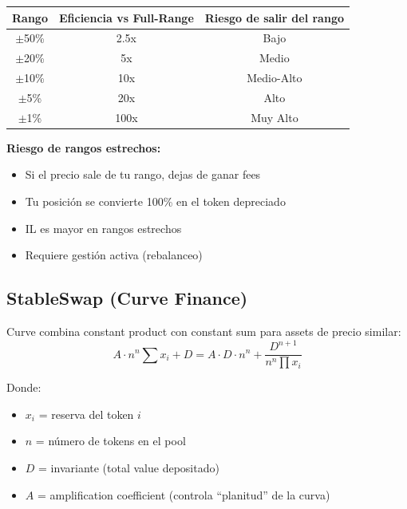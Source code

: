 \documentclass[11pt,a4paper,twoside]{book}
\begin{document}
\begin{center}
\begin{tabular}{ccc}
\toprule
Rango & Eficiencia vs Full-Range & Riesgo de salir del rango \\
\midrule
$\pm$50\% & 2.5x & Bajo \\
$\pm$20\% & 5x & Medio \\
$\pm$10\% & 10x & Medio-Alto \\
$\pm$5\% & 20x & Alto \\
$\pm$1\% & 100x & Muy Alto \\
\bottomrule
\end{tabular}
\end{center}

\begin{remark}
\textbf{Riesgo de rangos estrechos:}
\begin{itemize}
    \item Si el precio sale de tu rango, dejas de ganar fees
    \item Tu posici\'on se convierte 100\% en el token depreciado
    \item IL es mayor en rangos estrechos
    \item Requiere gesti\'on activa (rebalanceo)
\end{itemize}
\end{remark}

\subsection{StableSwap (Curve Finance)}

\begin{definition}
Curve combina constant product con constant sum para assets de precio similar:
\[
A \cdot n^n \sum x_i + D = A \cdot D \cdot n^n + \frac{D^{n+1}}{n^n \prod x_i}
\]

Donde:
\begin{itemize}
    \item $x_i$ = reserva del token $i$
    \item $n$ = n\'umero de tokens en el pool
    \item $D$ = invariante (total value depositado)
    \item $A$ = amplification coefficient (controla ``planitud'' de la curva)
\end{itemize}
\end{definition}
\end{document}
